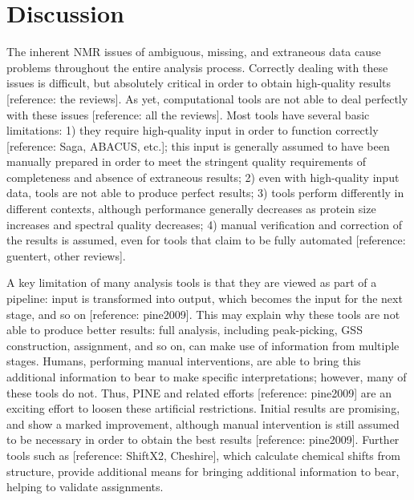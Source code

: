 \section{Discussion}

The inherent NMR issues of ambiguous, missing, and extraneous data cause 
problems throughout the entire analysis process.  Correctly dealing with 
these issues is difficult, but absolutely critical in order to obtain 
high-quality results [reference: the reviews].  As yet, computational tools 
are not able to deal perfectly with these issues [reference: all the reviews].  
Most tools have several basic limitations: 1) they require high-quality input 
in order to function correctly [reference: Saga, ABACUS, etc.]; this input is 
generally assumed to have been manually prepared in order to meet the 
stringent quality requirements of completeness and absence of extraneous 
results; 2) even with high-quality input data, tools are not able to produce 
perfect results; 3) tools perform differently in different contexts, although 
performance generally decreases as protein size increases and spectral quality 
decreases; 4) manual verification and correction of the results is assumed, 
even for tools that claim to be fully automated [reference: guentert, other reviews].

A key limitation of many analysis tools is that they are viewed as part of a 
pipeline: input is transformed into output, which becomes the input for the 
next stage, and so on [reference: pine2009].  This may explain why these tools 
are not able to produce better results:  full analysis, including peak-picking, 
GSS construction, assignment, and so on, can make use of information from 
multiple stages.  Humans, performing manual interventions, are able to bring 
this additional information to bear to make specific interpretations; however, 
many of these tools do not.  Thus, PINE and related efforts [reference: pine2009] 
are an exciting effort to loosen these artificial restrictions.  Initial 
results are promising, and show a marked improvement, although manual 
intervention is still assumed to be necessary in order to obtain the best 
results [reference: pine2009].  Further tools such as [reference: ShiftX2, Cheshire], 
which calculate chemical shifts from structure, provide additional means 
for bringing additional information to bear, helping to validate assignments.


